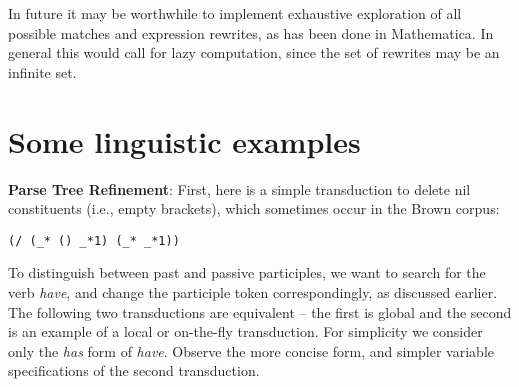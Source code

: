 \documentclass[a4,11pt]{article}
\begin{document}
In future it may be worthwhile to implement exhaustive exploration of all possible matches and expression rewrites, as has been done in Mathematica. In general this would call for lazy computation, since the set of rewrites may be an infinite set.



\section{Some linguistic examples}
{\bf Parse Tree Refinement}:
First, here is a simple transduction to delete nil constituents (i.e., empty brackets), which sometimes occur in the Brown corpus:

\texttt{(/ (\_* () \_*1) (\_* \_*1))}

To distinguish between past and passive participles, we want to search for the verb {\it have}, and change the participle token correspondingly, as discussed earlier.  The following two transductions are equivalent -- the first is global and the second is an example of a local or on-the-fly transduction. For simplicity we consider only the {\it has} form of {\it have}.  Observe the more concise form, and simpler variable specifications of the second transduction.\\
\end{document}
